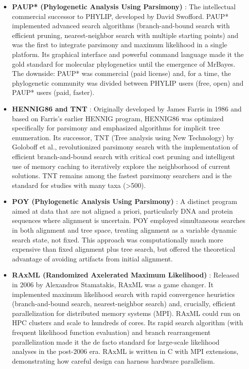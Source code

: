 \begin{itemize}
\item \textbf{PAUP* (Phylogenetic Analysis Using Parsimony)} \parencite{swofford1993}: The intellectual commercial successor to PHYLIP, developed by David Swofford. PAUP* implemented advanced search algorithms (branch-and-bound search with efficient pruning, nearest-neighbor search with multiple starting points) and was the first to integrate parsimony and maximum likelihood in a single platform. Its graphical interface and powerful command language made it the gold standard for molecular phylogenetics until the emergence of MrBayes. The downside: PAUP* was commercial (paid license) and, for a time, the phylogenetic community was divided between PHYLIP users (free, open) and PAUP* users (paid, faster).

\item \textbf{HENNIG86 and TNT} \parencite{goloboff2008}: Originally developed by James Farris in 1986 and based on Farris's earlier HENNIG program, HENNIG86 was optimized specifically for parsimony and emphasized algorithms for implicit tree enumeration. Its successor, TNT (Tree analysis using New Technology) by Goloboff et al., revolutionized parsimony search with the implementation of efficient branch-and-bound search with critical cost pruning and intelligent use of memory caching to iteratively explore the neighborhood of current solutions. TNT remains among the fastest parsimony searchers and is the standard for studies with many taxa (>500).

\item \textbf{POY (Phylogenetic Analysis Using Parsimony)} \parencite{wheeler2001}: A distinct program aimed at data that are not aligned a priori, particularly DNA and protein sequences where alignment is uncertain. POY employed simultaneous searches in both alignment and tree space, treating alignment as a variable dynamic search state, not fixed. This approach was computationally much more expensive than fixed alignment plus tree search, but offered the theoretical advantage of avoiding artifacts from initial alignment.

\item \textbf{RAxML (Randomized Axelerated Maximum Likelihood)} \parencite{stamatakis2006}: Released in 2006 by Alexandros Stamatakis, RAxML was a game changer. It implemented maximum likelihood search with rapid convergence heuristics (branch-and-bound search, nearest-neighbor search) and, crucially, efficient parallelization for distributed memory systems (MPI). RAxML could run on HPC clusters and scale to hundreds of cores. Its rapid search algorithm (with frequent likelihood function evaluation) and branch rearrangement parallelization made it the de facto standard for large-scale likelihood analyses in the post-2006 era. RAxML is written in C with MPI extensions, demonstrating how careful design can harness hardware parallelism.


\end{itemize}
